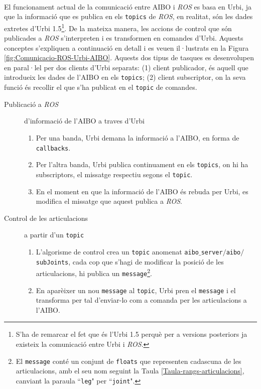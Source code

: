 \documentclass[12pt,a4paper,final,twoside]{article}
\begin{document}
\paragraph{}El funcionament actual de la comunicació entre AIBO i \textit{ROS} es basa en Urbi, ja que la informació que es publica en els \texttt{topics} de \textit{ROS}, en realitat, són les dades extretes d'Urbi 1.5\footnote{S'ha de remarcar el fet que és l'Urbi 1.5 perquè per a versions posteriors ja existeix la comunicació entre Urbi i \textit{ROS}.}. De la mateixa manera, les accions de control que són publicades a \textit{ROS} s'interpreten i es transformen en comandes d'Urbi. Aquests conceptes s'expliquen a continuació en detall i es veuen il·lustrats en la Figura \ref{fig:Comunicacio-ROS-Urbi-AIBO}. Aquests dos tipus de tasques es desenvolupen en paral·lel per dos clients d'Urbi separats: (1) client publicador, és aquell que introdueix les dades de l'AIBO en els \texttt{topics}; (2) client subscriptor, on la seva funció és recollir el que s'ha publicat en el \texttt{topic} de comandes.

\begin{description}

\item[Publicació a \textit{ROS}] d'informació de l'AIBO a traves d'Urbi
\begin{enumerate}
\item Per una banda, Urbi demana la informació a l'AIBO, en forma de \texttt{callbacks}.
\item Per l'altra banda, Urbi publica continuament en els \texttt{topics}, on hi ha subscriptors, el missatge respectiu segons el \texttt{topic}.
\item En el moment en que la informació de l'AIBO és rebuda per Urbi, es modifica el missatge que aquest publica a \textit{ROS}.
\end{enumerate}

\item[Control de les articulacions] a partir d'un \texttt{topic}
\begin{enumerate}
\item L'algorisme de control crea un \texttt{topic} anomenat \texttt{aibo$\_$server$/$aibo$/$subJoints}, cada cop que s'hagi de modificar la posició de les articulacions, hi publica un \texttt{message}\footnote{El \texttt{message} conté un conjunt de \texttt{floats} que representen cadascuna de les articulacions, amb el seu nom seguint la Taula \ref{Taula-rangs-articulacions}, canviant la paraula ``\texttt{leg}" per ``\texttt{joint}".}.
\item En aparèixer un nou \texttt{message} al \texttt{topic}, Urbi pren el \texttt{message} i el transforma per tal d'enviar-lo com a comanda per les articulacions a l'AIBO.  
\end{enumerate}

\end{description}
\end{document}
